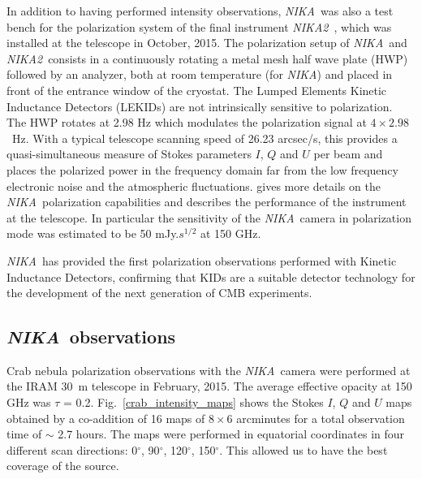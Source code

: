 \documentclass[twocolumn,traditabstract]{aa}
\def\NIKA{\textit{NIKA}}
\def\NIKAd{\textit{NIKA2}}
\begin{document}
In addition to having performed intensity observations, \NIKA\ was also a test
bench for the polarization system of the final instrument
\NIKAd\ \citep{calvo2016,2016arXiv160508628C}, which was installed at the
telescope in October, 2015. The polarization setup of \NIKA\ and
\NIKAd\ consists in a continuously rotating a metal mesh half wave plate (HWP)
followed by an analyzer, both at room temperature (for \NIKA) and placed in
front of the entrance window of the cryostat. The Lumped Elements Kinetic
Inductance Detectors (LEKIDs) are not intrinsically sensitive to
polarization. The HWP rotates at 2.98 Hz which modulates the polarization signal
at $4\times 2.98$~Hz. With a typical telescope scanning speed of 26.23 arcsec/s,
this provides a quasi-simultaneous measure of Stokes parameters $I$, $Q$ and $U$
per beam and
places the polarized power in the frequency domain far from the low frequency
electronic noise and the atmospheric fluctuations. \cite{ritacco2017} gives more
details on the \NIKA\ polarization capabilities and describes the performance of
the instrument at the telescope. In particular the sensitivity of the
\NIKA\ camera in polarization mode was estimated to be 50 mJy.$s^{1/2}$ at 150
GHz.

\NIKA\ has provided the first polarization
observations performed with Kinetic Inductance Detectors, confirming that KIDs are a
suitable detector technology for the development of the next generation of CMB
experiments.

\subsection{\NIKA\ observations}\label{sec:nika_observations}
Crab nebula polarization observations with the \NIKA\ camera were performed at
the IRAM 30~m telescope in February, 2015. The average effective opacity at 150 GHz was $\tau$ = 0.2.  Fig.~\ref{crab_intensity_maps} shows
the Stokes $I$, $Q$ and $U$ maps obtained by a co-addition of 16 maps
of $8 \times 6$ arcminutes for a total observation time of $\sim$ 2.7 hours. The
maps were performed in equatorial coordinates in four different scan
directions: 0$^{\circ}$, 90$^{\circ}$, 120$^{\circ}$, 150$^{\circ}$. This
allowed us to have the best coverage of the source.%
\end{document}
